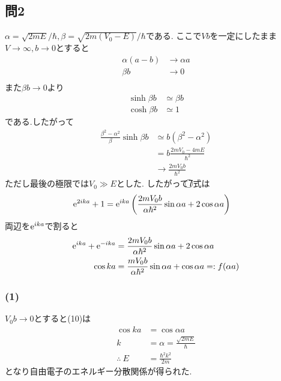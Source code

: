 \documentclass[uplatex,a4j,11pt,dvipdfmx]{jsarticle}
\begin{document}
\subsection*{問2}
$\alpha=\sqrt{2mE}/\hbar,\beta=\sqrt{2m(V_0-E)}/\hbar$である.
ここで$Vb$を一定にしたまま$V\rightarrow\infty,b\rightarrow 0$とすると
\begin{align*}
  \alpha(a-b)&\rightarrow\alpha a\\
  \beta b&\rightarrow 0\\
\end{align*}
また$\beta b\rightarrow 0$より
\begin{align*}
  \sinh\beta b&\simeq\beta b\\
  \cosh\beta b&\simeq 1
\end{align*}
である.したがって
\begin{align*}
  \frac{\beta^2-\alpha^2}{\beta}\sinh\beta b&\simeq b(\beta^2-\alpha^2)\\
  &=b\frac{2mV_0-4mE}{\hbar^2}\\
  &\rightarrow \frac{2mV_0b}{\hbar^2}
\end{align*}
ただし最後の極限では$V_0\gg E$とした.
したがって\textcircled{\scriptsize 7}式は
\begin{align*}
  {\rm e}^{2ika}+1&={\rm e}^{ika}\left(\frac{2mV_0b}{\alpha\hbar^2}\sin\alpha a+2\cos\alpha a\right)
\end{align*}
両辺を${\rm e}^{ika}$で割ると
\begin{align}
  {\rm e}^{ika}+{\rm e}^{-ika}&=\frac{2mV_0b}{\alpha\hbar^2}\sin\alpha a+2\cos\alpha a\nonumber\\
  \cos ka&=\frac{mV_0b}{\alpha\hbar^2}\sin\alpha a+\cos\alpha a=:f(\alpha a)
\end{align}
\newpage
\subsubsection*{(1)}
$V_0b\rightarrow 0$とすると(10)は
\begin{align}
  \cos ka&=\cos\alpha a\nonumber\\
  k&=\alpha=\frac{\sqrt{2mE}}{\hbar}\nonumber\\
  \therefore\ E&=\frac{\hbar^2k^2}{2m}
\end{align}
となり自由電子のエネルギー分散関係が得られた.
\end{document}
